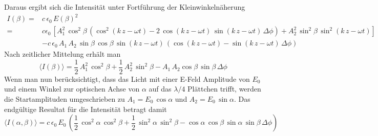 \documentclass[a4paper, 12pt,]{scrartcl}
\begin{document}
Daraus ergibt sich die Intensität unter Fortführung der Kleinwinkelnäherung
\begin{align*}I(\beta)=&c\,\epsilon_0\,E(\beta)^2\\
=&c\epsilon_0\,\left[A_1^2\,\cos^2\beta\,\left(\cos^2(k\,z-\omega{t})-2\,\cos(k\,z-\omega{t})\,\sin(k\,z-\omega{t})\,\Delta\phi\right)+A_2^2\,\sin^2\beta\,\sin^2(k\,z-\omega{t})\right]\\
&-c\,\epsilon_0\,A_1\,A_2\,\sin\beta\,\cos\beta\,\sin(k\,z-\omega{t})\,\left(\cos(k\,z-\omega{t})-\sin(k\,z-\omega{t})\,\Delta\phi\right)\end{align*}
Nach zeitlicher Mittelung erhält man
\begin{equation*}\langle{I(\beta)}\rangle=\frac{1}{2}\,A_1^2\,\cos^2\beta+\frac{1}{2}\,A_2^2\,\sin^2\beta-A_1\,A_2\cos\beta\,\sin\beta\,\Delta\phi\end{equation*}
Wenn man nun berücksichtigt, dass das Licht mit einer E-Feld Amplitude von $E_0$ und einem Winkel zur optischen Achse von $\alpha$ auf das $\lambda/4$ Plättchen trifft, werden die Startamplituden umgeschrieben zu $A_1=E_0\,\cos\alpha$ und $A_2=E_0\,\sin\alpha$. Das endgültige Resultat für die Intensität betragt damit
\begin{equation*}\langle{I}(\alpha,\beta)\rangle=c\,\epsilon_0\,E_0\,\left(\frac{1}{2}\,\cos^2\alpha\,\cos^2\beta+\frac{1}{2}\,\sin^2\alpha\,\sin^2\beta-\cos\alpha\,\cos\beta\,\sin\alpha\,\sin\beta\,\Delta\phi\right)\end{equation*}
\end{document}
